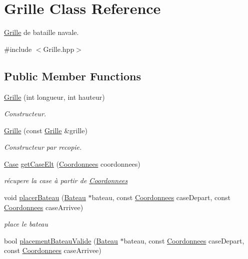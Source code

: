 \hypertarget{classGrille}{\section{Grille Class Reference}
\label{classGrille}
}


\hyperlink{classGrille}{Grille} de bataille navale.  




{\ttfamily \#include $<$Grille.\-hpp$>$}

\subsection*{Public Member Functions}
\begin{DoxyCompactItemize}
\item 
\hyperlink{classGrille_a8ab8101441bd383097961f336220de09}{Grille} (int longueur, int hauteur)
\begin{DoxyCompactList}\small\item\em Constructeur. \end{DoxyCompactList}\item 
\hyperlink{classGrille_aa54a85fa86139365ed3e0202b3309a0d}{Grille} (const \hyperlink{classGrille}{Grille} \&grille)
\begin{DoxyCompactList}\small\item\em Constructeur par recopie. \end{DoxyCompactList}\item 
\hyperlink{classCase}{Case} \hyperlink{classGrille_ae5085ad2d200b40b4b51dc7e5a20a960}{get\-Case\-Elt} (\hyperlink{classCoordonnees}{Coordonnees} coordonnees)
\begin{DoxyCompactList}\small\item\em récupere la case à partir de \hyperlink{classCoordonnees}{Coordonnees} \end{DoxyCompactList}\item 
void \hyperlink{classGrille_a6be182df8cd575bf2ce1a9b81ae01736}{placer\-Bateau} (\hyperlink{classBateau}{Bateau} $\ast$bateau, const \hyperlink{classCoordonnees}{Coordonnees} case\-Depart, const \hyperlink{classCoordonnees}{Coordonnees} case\-Arrivee)
\begin{DoxyCompactList}\small\item\em place le bateau \end{DoxyCompactList}\item 
bool \hyperlink{classGrille_aaa6d9cfaa0c62d357ddd64b46f07353a}{placement\-Bateau\-Valide} (\hyperlink{classBateau}{Bateau} $\ast$bateau, const \hyperlink{classCoordonnees}{Coordonnees} case\-Depart, const \hyperlink{classCoordonnees}{Coordonnees} case\-Arrivee)

\end{DoxyCompactItemize}
